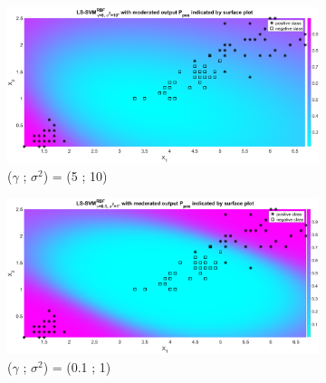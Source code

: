 \documentclass[12pt]{report}
\begin{document}
{\begin{figure}[!htbp]
	\begin{subfigure}{.33\textwidth}
		\centering
		\includegraphics[height=0.8\linewidth,width=1\linewidth]{Ex1.3.4_gam5_sig10.eps}
		\caption{($\gamma$ ; $\sigma^2$) = (5 ; 10)}
		\label{fig:gam5_sig10}
	\end{subfigure}
	\begin{subfigure}{.33\textwidth}
		\centering
		\includegraphics[height=0.8\linewidth,width=1\linewidth]{Ex1.3.4_gam0.1_sig1.eps}
		\caption{($\gamma$ ; $\sigma^2$) = (0.1 ; 1)}
		\label{fig:gam0.1_sig1}
	\end{subfigure}%
	\begin{subfigure}{.33\textwidth}

\end{subfigure}
\end{figure}}
\end{document}
